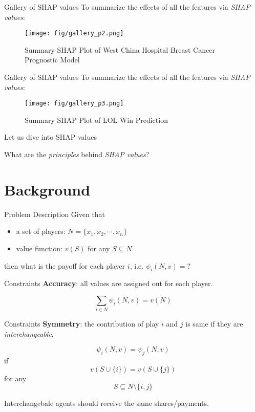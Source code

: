 \documentclass[10pt]{beamer}
\newcommand{\shap}{\emph{SHAP values}\xspace}
\begin{document}
\begin{frame}[fragile]{Gallery of SHAP values}
  To summarize the effects of all the features via \shap :
  \begin{figure}[htbp]
    \centering
    \texttt{[image: fig/gallery\_p2.png]}
    \caption{Summary SHAP Plot of West China Hospital Breast Cancer Prognostic Model}
  \end{figure}
\end{frame}

\begin{frame}[fragile]{Gallery of SHAP values}
  To summarize the effects of all the features via \shap :
  \begin{figure}[htbp]
    \centering
    \texttt{[image: fig/gallery\_p3.png]}
    \caption{Summary SHAP Plot of LOL Win Prediction}
  \end{figure}
\end{frame}

\begin{frame}{Let us dive into SHAP values}
  \begin{center}What are the \emph{principles} behind \shap ?\end{center}
\end{frame}

\section{Background}

\begin{frame}{Problem Description}
  Given that 
  \begin{itemize}
    \item a set of players: $N=\{x_1, x_2, \cdots, x_n\}$
    \item value function: $v(S)$ for any $S\subseteq N$
  \end{itemize}
  then what is the payoff for each player $i$, i.e. $\psi_i(N, v)=?$
	
\end{frame}

\begin{frame}{Constraints}
  \textbf{Accuracy}: all values are assigned out for each player.

  $$\sum_{i\in N} \psi_{i}(N, v) = v(N)$$

\end{frame}

\begin{frame}{Constraints}
  \textbf{Symmetry}: the contribution of play $i$ and $j$ is same if they are \emph{interchangeable}.
  
  $$\psi_{i}(N, v) = \psi_{j}(N, v)$$ if $$v(S\cup \{i\})=v(S\cup \{j\})$$ for any $$S\subseteq N\setminus \{i,j\}$$
    
  Interchangebale agents should receive the same shares/payments.
\end{frame}
\end{document}
